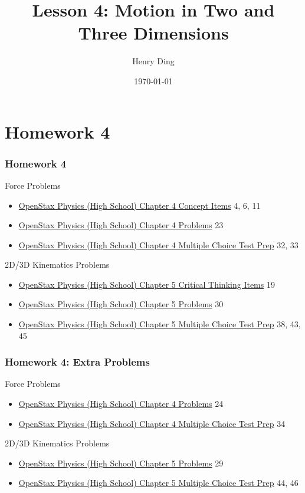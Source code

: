 \documentclass[20pt]{beamer}
\author{Henry Ding}
\date{\today}
\title{Lesson 4: Motion in Two and Three Dimensions}
\begin{document}
\frame{\titlepage}

\section{Homework 4}

\begin{frame}
	\frametitle{Homework 4}
	\begin{block}{Force Problems}
		\begin{itemize}
			\item \href{https://openstax.org/books/physics/pages/4-concept-items}{OpenStax Physics (High School) Chapter 4 Concept Items} 4, 6, 11
			\item \href{https://openstax.org/books/physics/pages/4-problems}{OpenStax Physics (High School) Chapter 4 Problems} 23
			\item \href{https://openstax.org/books/physics/pages/4-multiple-choice}{OpenStax Physics (High School) Chapter 4 Multiple Choice Test Prep} 32, 33
		\end{itemize}
	\end{block}
	\begin{block}{2D/3D Kinematics Problems}
		\begin{itemize}
			\item \href{https://openstax.org/books/physics/pages/5-critical-thinking-items}{OpenStax Physics (High School) Chapter 5 Critical Thinking Items} 19
			\item \href{https://openstax.org/books/physics/pages/5-problems}{OpenStax Physics (High School) Chapter 5 Problems} 30
			\item \href{https://openstax.org/books/physics/pages/5-multiple-choice}{OpenStax Physics (High School) Chapter 5 Multiple Choice Test Prep} 38, 43, 45
		\end{itemize}
	\end{block}
\end{frame}

\begin{frame}
	\frametitle{Homework 4: Extra Problems}
	\begin{block}{Force Problems}
		\begin{itemize}
			\item \href{https://openstax.org/books/physics/pages/4-problems}{OpenStax Physics (High School) Chapter 4 Problems} 24
			\item \href{https://openstax.org/books/physics/pages/4-multiple-choice}{OpenStax Physics (High School) Chapter 4 Multiple Choice Test Prep} 34
		\end{itemize}
	\end{block}
	\begin{block}{2D/3D Kinematics Problems}
		\begin{itemize}
			\item \href{https://openstax.org/books/physics/pages/5-problems}{OpenStax Physics (High School) Chapter 5 Problems} 29
			\item \href{https://openstax.org/books/physics/pages/5-multiple-choice}{OpenStax Physics (High School) Chapter 5 Multiple Choice Test Prep} 44, 46
		\end{itemize}
	\end{block}
\end{frame}
\end{document}
